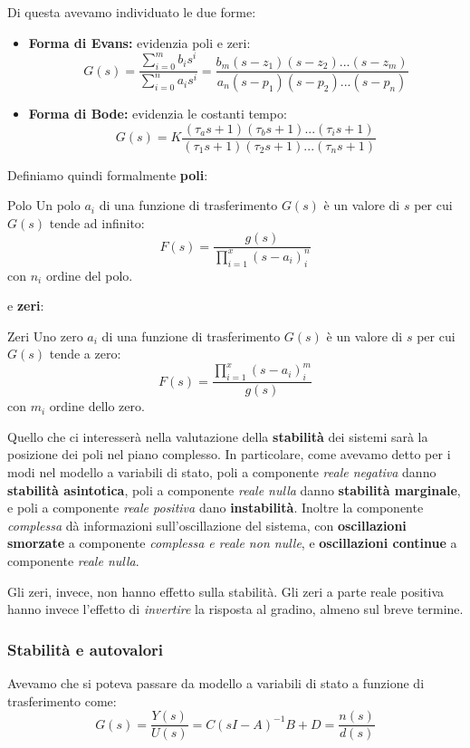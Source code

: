 \documentclass[a4paper,11pt]{article}
\begin{document}
Di questa avevamo individuato le due forme:
\begin{itemize}
	\item \textbf{Forma di Evans:} evidenzia poli e zeri:
		$$
G(s) = \frac{\sum_{i = 0}^m b_i s^i}{\sum_{i = 0}^n a_i s^i} = \frac{ b_m (s - z_1) (s - z_2) ... (s - z_m) }{ a_n (s - p_1) (s - p_2) ... (s - p_n) }
		$$
	\item \textbf{Forma di Bode:} evidenzia le costanti tempo: 
		$$
G(s) = K \frac{ (\tau_a s + 1) (\tau_b s + 1) ... (\tau_i s + 1) }{ (\tau_1 s + 1) (\tau_2 s + 1) ... (\tau_n s + 1) }
		$$
\end{itemize}

Definiamo quindi formalmente \textbf{poli}:
\begin{definition}{Polo}
	Un polo $a_i$ di una funzione di trasferimento $G(s)$ è un valore di $s$ per cui $G(s)$ tende ad infinito:
	$$
	F(s) = \frac{g(s)}{\prod_{i = 1}^x (s - a_i)^n_i}
	$$
	con $n_i$ ordine del polo.
\end{definition}
e \textbf{zeri}:
\begin{definition}{Zeri}
	Uno zero $a_i$ di una funzione di trasferimento $G(s)$ è un valore di $s$ per cui $G(s)$ tende a zero: 
	$$
	F(s) = \frac{\prod_{i = 1}^x (s - a_i)^m_i}{g(s)}
	$$
	con $m_i$ ordine dello zero.
\end{definition}

Quello che ci interesserà nella valutazione della \textbf{stabilità} dei sistemi sarà la posizione dei poli nel piano complesso.
In particolare, come avevamo detto per i modi nel modello a variabili di stato, poli a componente \textit{reale negativa} danno \textbf{stabilità asintotica}, poli a componente \textit{reale nulla} danno \textbf{stabilità marginale}, e poli a componente \textit{reale positiva} dano \textbf{instabilità}.
Inoltre la componente \textit{complessa} dà informazioni sull'oscillazione del sistema, con \textbf{oscillazioni smorzate} a componente \textit{complessa e reale non nulle}, e \textbf{oscillazioni continue} a componente \textit{reale nulla}.

Gli zeri, invece, non hanno effetto sulla stabilità.
Gli zeri a parte reale positiva hanno invece l'effetto di \textit{invertire} la risposta al gradino, almeno sul breve termine.

\subsubsection{Stabilità e autovalori}
Avevamo che si poteva passare da modello a variabili di stato a funzione di trasferimento come:
$$
G(s) = \frac{Y(s)}{U(s)} = C(sI - A)^{-1} B + D = \frac{n(s)}{d(s)}
$$
\end{document}
